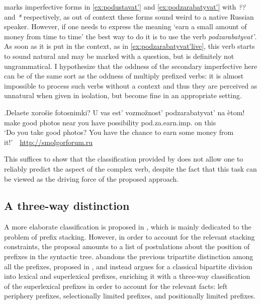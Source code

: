 \cite{Kagan:book} marks imperfective forms in \ref{ex:podustavat'} and \ref{ex:podzarabatyvat'} with \textit{??} and \textit{*} respectively, as out of context these forms sound weird to a native Russian speaker. However, if one needs to express the meaning `earn a small amount of money from time to time' the best way to do it is to use the verb \textit{podzarabatyvat'}. As soon as it is put in the context, as in \ref{ex:podzarabatyvat'live}, this verb starts to sound natural and may be marked with a question, but is definitely not ungrammatical. I hypothesize that the oddness of the secondary imperfective here can be of the same sort as the oddness of multiply prefixed verbs: it is almost impossible to process such verbs without a context and thus they are perceived as unnatural when given in isolation, but become fine in an appropriate setting.

\exg.\label{ex:podzarabatyvat'live}Delaete xoro\v{s}ie fotosnimki? U vas est' vozmo\v{z}nost' podzarabatyvat' na \`{e}tom!\\
make good photos near you have possibility pod.za.earn.imp. on this\\
\trans `Do you take good photos? You have the chance to earn some money from it!'~~\hbox{}\hfill\hbox{\url{http://smolgorforum.ru}}

This suffices to show that the classification provided by \citet{Tatevosov:07} does not allow one to reliably predict the aspect of the complex verb, despite the fact that this task can be viewed as the driving force of the proposed approach. 

\subsection{A three-way distinction}\label{section:Tat09}
A more elaborate classification is proposed in \citealt{Tatevosov:09}, which is mainly dedicated to the problem of prefix stacking. However, in order to account for the relevant stacking constraints, the proposal amounts to a list of postulations about the position of prefixes in the syntactic tree. \citet{Tatevosov:09} abandons the previous tripartite distinction among all the prefixes, proposed in \citet{Tatevosov:07}, and instead argues for a classical bipartite division into lexical and superlexical prefixes, enriching it with a three-way classification of the superlexical prefixes in order to account for the relevant facts: left periphery prefixes, selectionally limited prefixes, and positionally limited prefixes.

